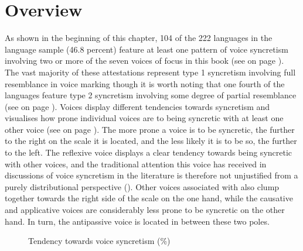 \section{Overview} \label{dist:overview}
As shown in the beginning of this chapter, 104 of the 222 languages in the language sample (46.8 percent) feature at least one pattern of voice syncretism involving two or more of the seven voices of focus in this book (see  on page \pageref{tab:ch6:voice-syncretism}). The vast majority of these attestations represent type 1 syncretism involving full resemblance in voice marking though it is worth noting that one fourth of the languages feature type 2 syncretism involving some degree of partial resemblance (see  on page \pageref{tab:ch6:voice-syncretism-type-2}). Voices display different tendencies towards syncretism and  visualises how prone individual voices are to being syncretic with at least one other voice (see  on page \pageref{tab:ch6:voice-syncretism-macroarea-2}). The more prone a voice is to be syncretic, the further to the right on the scale it is located, and the less likely it is to be so, the further to the left. The reflexive voice displays a clear tendency towards being syncretic with other voices, and the traditional attention this voice has received in discussions of voice syncretism in the literature is therefore not unjustified from a purely distributional perspective (). Other voices associated with  also clump together towards the right side of the scale on the one hand, while the causative and applicative voices are considerably less prone to be syncretic on the other hand. In turn, the antipassive voice is located in between these two poles.

\begin{figure}
	\caption{Tendency towards voice syncretism (\%)}
	\label{ch6:fig:scale-syncretism}
\end{figure}

